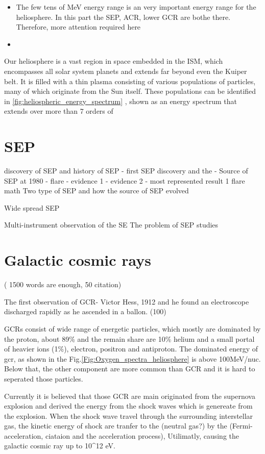 \begin{itemize}
	\item The few tens of MeV energy range is an very important energy range for the heliosphere. In this part the SEP, ACR, lower GCR are bothe there. Therefore, more attention required here
	\item 
\end{itemize}

Our heliosphere is a vast region in space embedded in the \ac{ISM}, which encompasses all solar system planets and extends far beyond even the Kuiper belt. 
It is filled with a thin plasma consisting of various populations of particles, many of which originate from the Sun itself. These populations can be identified in \autoref{fig:heliospheric_energy_spectrum} \citep[based on measurements by][]{Mewaldt-2001}, shown as an energy spectrum that extends over more than 7 orders of 

\section{SEP}

discovery of SEP and history of SEP
- first SEP discovery and the 
-  Source of SEP at 1980 - flare
 - evidence 1
 - evidence 2
 - most represented result 1
flare math
Two type of SEP and how the source of SEP evolved

Wide spread SEP

Multi-instrument observation of the SE
The problem of SEP studies



\section{Galactic cosmic rays} ( 1500 words are enough, 50 citation)


The first observation of GCR- Victor Hess, 1912 and he found an electroscope discharged rapidly as he ascended in a ballon.
  (100)
  

GCRs consist of wide range of energetic particles,  which mostly are dominated by the proton, about 89\%  and the remain share are 10\% helium and a small portal of heavier ions (1\%), electron, positron and antiproton. The dominated energy of gcr, as shown in the Fig.\ref{Fig:Oxygen_spectra_heliosphere} is above 100MeV/nuc. Below that, the other component are more common than GCR and it is hard to seperated those particles.

Currently it is believed that those GCR are main originated from the supernova explosion and derived the energy from the shock waves which is genereate from the explosion. When the shock wave travel through the surrounding interstellar gas, the kinetic energy of shock are tranfer to the  (neutral gas?) by the (Fermi-acceleration, ciataion and the acceleration process), Utilimatly, causing the galactic cosmic ray up to 10^12 eV.

